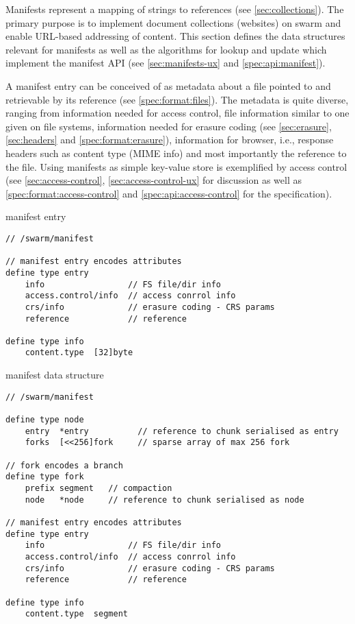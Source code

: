 Manifests represent a mapping of strings to references (see \ref{sec:collections}). The primary purpose is to implement document collections (websites) on swarm and enable URL-based addressing of content. This section defines the data structures relevant for manifests as well as the algorithms for lookup and update which implement the manifest API (see \ref{sec:manifests-ux} and \ref{spec:api:manifest}).

A manifest entry can be conceived of as metadata about a file pointed to and retrievable by its reference (see \ref{spec:format:files}). The metadata is quite diverse, ranging from information needed for access control, file information similar to one given on file systems, information needed for erasure coding (see \ref{sec:erasure}, \ref{sec:headers} and \ref{spec:format:erasure}), information for browser, i.e.,  response headers such as content type (MIME info) and most importantly the reference to the file. Using manifests as simple key-value store is exemplified by access control (see \ref{sec:access-control}, \ref{sec:access-control-ux} for discussion as well as \ref{spec:format:access-control} and \ref{spec:api:access-control} for the specification).

\begin{definition}{manifest entry}\label{def:manifest-entry}
\begin{lstlisting}[language=buzz1]
// /swarm/manifest

// manifest entry encodes attributes 
define type entry 
    info                 // FS file/dir info
    access.control/info  // access conrrol info
    crs/info             // erasure coding - CRS params
    reference            // reference

define type info
    content.type  [32]byte

\end{lstlisting}
\end{definition}

\begin{definition}{manifest data structure}\label{def:manifests}
\begin{lstlisting}[language=buzz1]
// /swarm/manifest

define type node 
    entry  *entry          // reference to chunk serialised as entry
    forks  [<<256]fork     // sparse array of max 256 fork

// fork encodes a branch
define type fork 
    prefix segment   // compaction 
    node   *node     // reference to chunk serialised as node

// manifest entry encodes attributes 
define type entry 
    info                 // FS file/dir info
    access.control/info  // access conrrol info
    crs/info             // erasure coding - CRS params
    reference            // reference

define type info
    content.type  segment

\end{lstlisting}
\end{definition}

